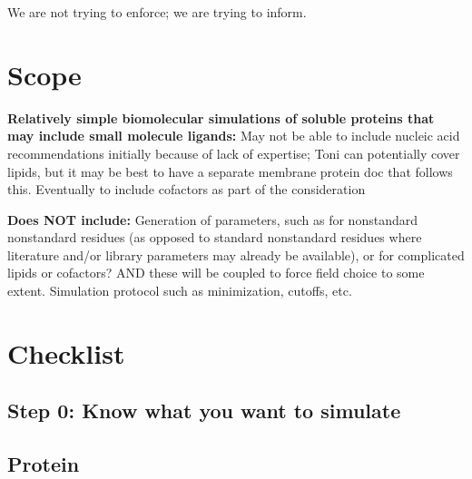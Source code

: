 \documentclass[9pt]{livecoms}
\begin{document}
We are not trying to enforce; we are trying to inform.

\section{Scope}


\textbf{Relatively simple biomolecular simulations of soluble proteins that may include small molecule ligands: }
May not be able to include nucleic acid recommendations initially because of lack of expertise; Toni can potentially cover lipids, but it may be best to have a separate membrane protein doc that follows this.
Eventually to include cofactors as part of the consideration

\textbf{Does NOT include: }
Generation of parameters, such as for nonstandard nonstandard residues (as opposed to standard nonstandard residues where literature and/or library parameters may already be available), or for complicated lipids or cofactors? AND these will be coupled to force field choice to some extent.
Simulation protocol such as minimization, cutoffs, etc. 

\section{Checklist}

\subsection{ Step 0: Know what you want to simulate }



\subsection{Protein} 
\end{document}
